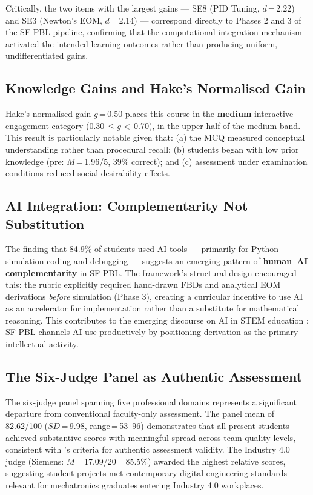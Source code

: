 \documentclass[12pt, a4paper]{article}
\begin{document}
Critically, the two items with the largest gains --- SE8 (PID
Tuning, $d$\,=\,2.22) and SE3 (Newton's EOM, $d$\,=\,2.14) ---
correspond directly to Phases 2 and 3 of the SF-PBL pipeline,
confirming that the computational integration mechanism activated
the intended learning outcomes rather than producing uniform,
undifferentiated gains.

\subsection{Knowledge Gains and Hake's Normalised Gain}

Hake's normalised gain $g$\,=\,0.50 places this course in the
\textbf{medium} interactive-engagement category
\citep{hake1998interactive} (0.30\,$\leq g <$\,0.70), in the
upper half of the medium band. This result is particularly notable
given that: (a) the MCQ measured conceptual understanding rather
than procedural recall; (b) students began with low prior knowledge
(pre: $M$\,=\,1.96/5, 39\% correct); and (c) assessment under
examination conditions reduced social desirability effects.

\subsection{AI Integration: Complementarity Not Substitution}

The finding that 84.9\% of students used AI tools --- primarily
for Python simulation coding and debugging --- suggests an emerging
pattern of \textbf{human--AI complementarity} in SF-PBL. The
framework's structural design encouraged this: the rubric
explicitly required hand-drawn FBDs and analytical EOM derivations
\textit{before} simulation (Phase 3), creating a curricular
incentive to use AI as an accelerator for implementation rather
than a substitute for mathematical reasoning. This contributes to
the emerging discourse on AI in STEM education \citep{tlili2023chatgpt}:
SF-PBL channels AI use productively by positioning derivation as
the primary intellectual activity.

\subsection{The Six-Judge Panel as Authentic Assessment}

The six-judge panel spanning five professional domains represents
a significant departure from conventional faculty-only assessment.
The panel mean of 82.62/100 ($SD$\,=\,9.98, range\,=\,53--96)
demonstrates that all present students achieved substantive scores
with meaningful spread across team quality levels, consistent with
\citeauthor{gulikers2004five}'s \citeyearpar{gulikers2004five}
criteria for authentic assessment validity. The Industry 4.0 judge
(Siemens: $M$\,=\,17.09/20\,=\,85.5\%) awarded the highest
relative scores, suggesting student projects met contemporary
digital engineering standards relevant for mechatronics graduates
entering Industry 4.0 workplaces.
\end{document}
